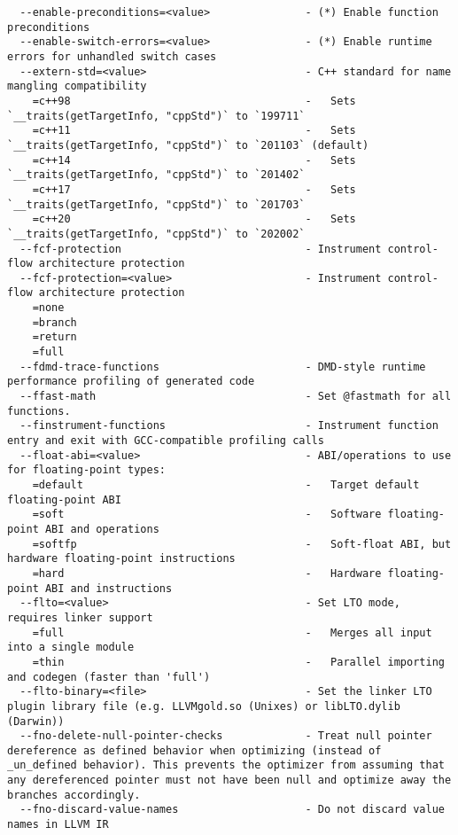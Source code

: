\documentclass[732]{studrep}
\begin{document}
\begin{verbatim}
  --enable-preconditions=<value>               - (*) Enable function preconditions
  --enable-switch-errors=<value>               - (*) Enable runtime errors for unhandled switch cases
  --extern-std=<value>                         - C++ standard for name mangling compatibility
    =c++98                                     -   Sets `__traits(getTargetInfo, "cppStd")` to `199711`
    =c++11                                     -   Sets `__traits(getTargetInfo, "cppStd")` to `201103` (default)
    =c++14                                     -   Sets `__traits(getTargetInfo, "cppStd")` to `201402`
    =c++17                                     -   Sets `__traits(getTargetInfo, "cppStd")` to `201703`
    =c++20                                     -   Sets `__traits(getTargetInfo, "cppStd")` to `202002`
  --fcf-protection                             - Instrument control-flow architecture protection
  --fcf-protection=<value>                     - Instrument control-flow architecture protection
    =none
    =branch
    =return
    =full
  --fdmd-trace-functions                       - DMD-style runtime performance profiling of generated code
  --ffast-math                                 - Set @fastmath for all functions.
  --finstrument-functions                      - Instrument function entry and exit with GCC-compatible profiling calls
  --float-abi=<value>                          - ABI/operations to use for floating-point types:
    =default                                   -   Target default floating-point ABI
    =soft                                      -   Software floating-point ABI and operations
    =softfp                                    -   Soft-float ABI, but hardware floating-point instructions
    =hard                                      -   Hardware floating-point ABI and instructions
  --flto=<value>                               - Set LTO mode, requires linker support
    =full                                      -   Merges all input into a single module
    =thin                                      -   Parallel importing and codegen (faster than 'full')
  --flto-binary=<file>                         - Set the linker LTO plugin library file (e.g. LLVMgold.so (Unixes) or libLTO.dylib (Darwin))
  --fno-delete-null-pointer-checks             - Treat null pointer dereference as defined behavior when optimizing (instead of _un_defined behavior). This prevents the optimizer from assuming that any dereferenced pointer must not have been null and optimize away the branches accordingly.
  --fno-discard-value-names                    - Do not discard value names in LLVM IR

\end{verbatim}
\end{document}
